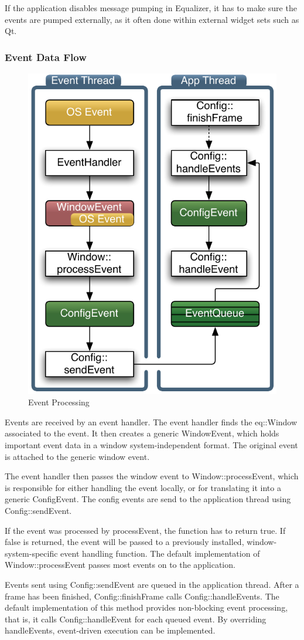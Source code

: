 \documentclass[10pt,a4]{scrartcl}
\begin{document}
If the application disables message pumping in Equalizer, it has to make
sure the events are pumped externally, as it often done within external
widget sets such as Qt.


\subsubsection{Event Data Flow}

\begin{figure}
  \includegraphics[width=.382\textwidth]{images/eventFilter.pdf}
  {\caption{\small\label{fEventProcessing}Event Processing}}
\end{figure}
Events are received by an event handler. The event handler finds the
\textsf{eq::Window} associated to the event. It then creates a generic
\textsf{WindowEvent}, which holds important event data in a 
window system-independent format. The original event is attached to the
generic window event.

The event handler then passes the window event to
\textsf{Window::processEvent}, which is responsible for either handling
the event locally, or for translating it into a generic
\textsf{ConfigEvent}. The config events are send to the application
thread using \textsf{Config::sendEvent}. 

If the event was processed by \textsf{processEvent}, the function has to
return \textsf{true}. If \textsf{false} is returned, the event will be
passed to a previously installed, window-system-specific event handling
function. The default implementation of \textsf{Window::processEvent}
passes most events on to the application.

Events sent using \textsf{Config::sendEvent} are queued in the
application thread. After a frame has been finished,
\textsf{Config::finishFrame} calls \textsf{Config::handleEvents}. The
default implementation of this method provides non-blocking event
processing, that is, it calls \textsf{Config::handleEvent} for each
queued event. By overriding \textsf{handleEvents}, event-driven
execution can be implemented.
\end{document}
